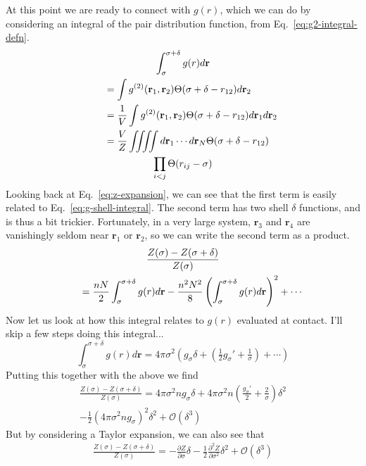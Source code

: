 \documentclass[letterpaper,twocolumn,amsmath,amssymb,pre,aps,10pt]{revtex4-1}
\newcommand{\rr}{\textbf{r}}
\begin{document}
At this point we are ready to connect with $g(r)$, which we can do by
considering an integral of the pair distribution function, from
Eq.~\ref{eq:g2-integral-defn}.
\begin{multline}
  \int_{\sigma}^{\sigma+\delta} g(r) d\rr\\
  \shoveleft{\quad= \int g^{(2)}(\rr_1,\rr_2)
  \Theta(\sigma+\delta-r_{12})d\rr_2} \\
  \shoveleft{\quad= \frac{1}{V}\int g^{(2)}(\rr_1,\rr_2)
  \Theta(\sigma+\delta-r_{12})d\rr_1d\rr_2} \\
  \shoveleft{\quad= \frac{V}{Z}\iiiint d\rr_1\cdots d\rr_N
  \Theta(\sigma+\delta-r_{12})}\\
  \prod_{i<j} \Theta(r_{ij}-\sigma)
  \label{eq:g-shell-integral}
\end{multline}
Looking back at Eq.~\ref{eq:z-expansion}, we can see that the first
term is easily related to Eq.~\ref{eq:g-shell-integral}.  The second
term has two shell $\delta$ functions, and is thus a bit trickier.
Fortunately, in a very large system, $\rr_3$ and $\rr_4$ are
vanishingly seldom near $\rr_1$ or $\rr_2$, so we can write the second
term as a product.
\begin{multline}
  \frac{Z(\sigma)-Z(\sigma+\delta)}{Z(\sigma)}\\
  \shoveleft{\quad= \frac{nN}{2} \int_{\sigma}^{\sigma+\delta} g(r) d\rr }
  - \frac{n^2N^2}{8} \left(\int_{\sigma}^{\sigma+\delta} g(r)
  d\rr\right)^2
  + \cdots
  \label{eq:zdiff-g}
\end{multline}
Now let us look at how this integral relates to $g(r)$ evaluated at
contact.  I'll skip a few steps doing this integral...
\begin{equation}
   \int_{\sigma}^{\sigma+\delta} g(r)
  d\rr = 4\pi\sigma^2\left(g_\sigma\delta + \left(\tfrac12g_\sigma' +
  \tfrac1{\sigma}\right) + \cdots \right)
\end{equation}
Putting this together with the above we find
\begin{multline}
  \frac{Z(\sigma)-Z(\sigma+\delta)}{Z(\sigma)} =
  4\pi\sigma^2 n g_\sigma \delta +
  4\pi\sigma^2 n \left(\tfrac{g_\sigma'}{2} + \tfrac{2}{\sigma}\right)
  \delta^2 \\
  - \tfrac{1}{2}\left(4\pi\sigma^2ng_\sigma\right)^2\delta^2 + \mathcal{O}(\delta^3)
\end{multline}
But by considering a Taylor expansion, we can also see that
\begin{multline}
  \frac{Z(\sigma)-Z(\sigma+\delta)}{Z(\sigma)} =
  -\frac{\partial Z}{\partial \sigma} \delta
  -\frac12 \frac{\partial^2 Z}{\partial \sigma^2} \delta^2  + \mathcal{O}(\delta^3)
\end{multline}
\end{document}
